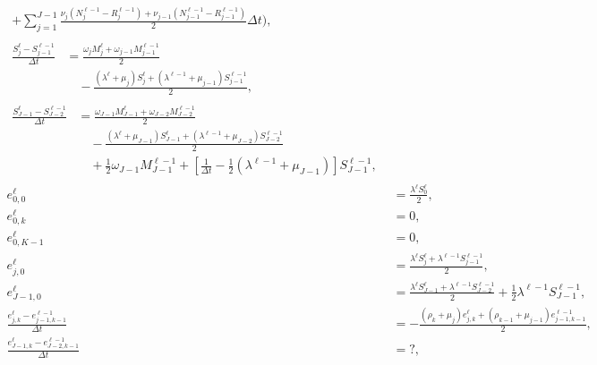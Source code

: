 \documentclass{jpmarticle}
\let\subequationsorig\subequations%
\let\endsubequationsorig\endsubequations%
\renewenvironment{subequations}{
  \subequationsorig
  \renewcommand{\theequation}{\theparentequation.\arabic{equation}}
}{
  \endsubequationsorig
}
\begin{document}
\begin{subequations}
\begin{align}
\begin{split}
      + \sum_{j = 1}^{J - 1}
      \frac{\nu_j (N_j^{\ell - 1} - R_j^{\ell - 1})
        + \nu_{j - 1} (N_{j - 1}^{\ell - 1} - R_{j - 1}^{\ell - 1})}
      {2}
      \Delta t
      \Bigg),
    \end{split}
    \\
    \begin{split}
      \frac{S_j^{\ell} - S_{j - 1}^{\ell - 1}}{\Delta t}
      &=
      \frac{\omega_j M_j^{\ell}
        + \omega_{j - 1} M_{j - 1}^{\ell - 1}}
      {2}
      \\ & \quad {}
      - \frac{(\lambda^{\ell} + \mu_j) S_j^{\ell}
        + (\lambda^{\ell - 1} + \mu_{j - 1}) S_{j - 1}^{\ell - 1}}
      {2},
    \end{split}
    \\
    \begin{split}
      \frac{S_{J - 1}^{\ell} - S_{J - 2}^{\ell - 1}}{\Delta t}
      &=
      \frac{\omega_{J - 1} M_{J - 1}^{\ell}
        + \omega_{J - 2} M_{J - 2}^{\ell - 1}}
      {2}
      \\ & \quad {}
      - \frac{(\lambda^{\ell} + \mu_{J - 1}) S_{J - 1}^{\ell}
        + (\lambda^{\ell - 1} + \mu_{J - 2}) S_{J - 2}^{\ell - 1}}
      {2}
      \\ & \quad {}
      + \frac{1}{2} \omega_{J - 1} M_{J - 1}^{\ell - 1}
      + \left[\frac{1}{\Delta t}
        - \frac{1}{2} (\lambda^{\ell - 1} + \mu_{J - 1})\right]
      S_{J - 1}^{\ell - 1},
    \end{split}
    \\
    e_{0, 0}^{\ell}
    &=
    \frac{\lambda^{\ell} S_0^{\ell}}
    {2},
    \\
    e_{0, k}^{\ell}
    &= 0,
    \\
    e_{0, K - 1}^{\ell}
    &= 0,
    \\
    e_{j, 0}^{\ell}
    &=
    \frac{\lambda^{\ell} S_j^{\ell}
      + \lambda^{\ell - 1} S_{j - 1}^{\ell - 1}}
    {2},
    \\
    e_{J - 1, 0}^{\ell}
    &=
    \frac{\lambda^{\ell} S_{J - 1}^{\ell}
      + \lambda^{\ell - 1} S_{J - 2}^{\ell - 1}}
    {2}
    + \frac{1}{2} \lambda^{\ell - 1} S_{J - 1}^{\ell - 1},
    \\
    \frac{e_{j, k}^{\ell} - e_{j - 1, k - 1}^{\ell - 1}}{\Delta t}
    &=
    - \frac{(\rho_k + \mu_j) e_{j, k}^{\ell}
      + (\rho_{k - 1} + \mu_{j - 1}) e_{j - 1, k - 1}^{\ell - 1}}
    {2},
    \\
    \frac{e_{J - 1, k}^{\ell} - e_{J - 2, k - 1}^{\ell - 1}}{\Delta t}
    &= ?,
    \\

\end{align}
\end{subequations}
\end{document}
